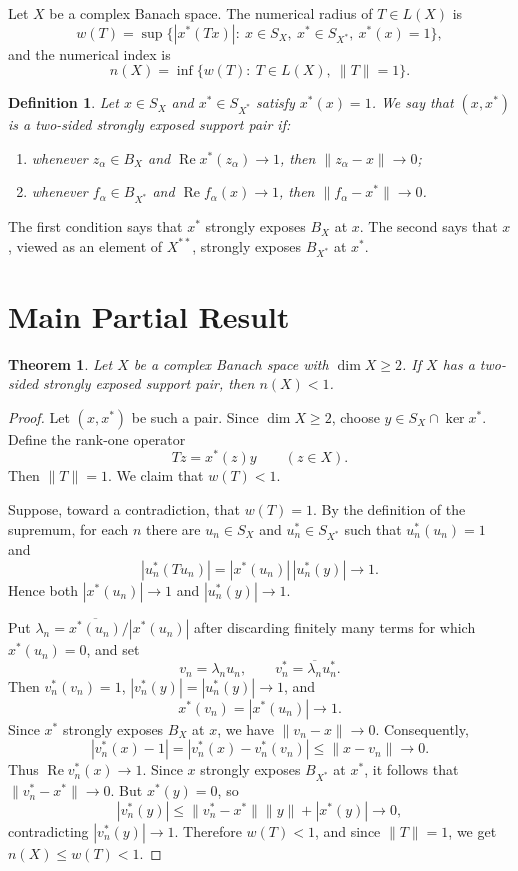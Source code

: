 \documentclass[11pt]{article}
\newtheorem{theorem}{Theorem}
\newtheorem{definition}{Definition}
\newcommand{\Ree}{\operatorname{Re}}
\begin{document}
Let $X$ be a complex Banach space.  The numerical radius of $T\in L(X)$ is
\[
  w(T)=\sup\{|x^*(Tx)|:\ x\in S_X,\ x^*\in S_{X^*},\ x^*(x)=1\},
\]
and the numerical index is
\[
  n(X)=\inf\{w(T):\ T\in L(X),\ \|T\|=1\}.
\]

\begin{definition}
Let $x\in S_X$ and $x^*\in S_{X^*}$ satisfy $x^*(x)=1$.
We say that $(x,x^*)$ is a two-sided strongly exposed support pair if:
\begin{enumerate}
\item whenever $z_\alpha\in B_X$ and $\Ree x^*(z_\alpha)\to 1$, then $\|z_\alpha-x\|\to 0$;
\item whenever $f_\alpha\in B_{X^*}$ and $\Ree f_\alpha(x)\to 1$, then $\|f_\alpha-x^*\|\to 0$.
\end{enumerate}
\end{definition}

The first condition says that $x^*$ strongly exposes $B_X$ at $x$.  The second says that $x$, viewed as an element of $X^{**}$, strongly exposes $B_{X^*}$ at $x^*$.

\section*{Main Partial Result}

\begin{theorem}
Let $X$ be a complex Banach space with $\dim X\ge 2$.  If $X$ has a two-sided strongly exposed support pair, then $n(X)<1$.
\end{theorem}

\begin{proof}
Let $(x,x^*)$ be such a pair.  Since $\dim X\ge 2$, choose $y\in S_X\cap \ker x^*$.  Define the rank-one operator
\[
  Tz=x^*(z)y\qquad (z\in X).
\]
Then $\|T\|=1$.  We claim that $w(T)<1$.

Suppose, toward a contradiction, that $w(T)=1$.  By the definition of the supremum, for each $n$ there are $u_n\in S_X$ and $u_n^*\in S_{X^*}$ such that $u_n^*(u_n)=1$ and
\[
  |u_n^*(Tu_n)|=|x^*(u_n)|\,|u_n^*(y)|\longrightarrow 1.
\]
Hence both $|x^*(u_n)|\to 1$ and $|u_n^*(y)|\to 1$.

Put $\lambda_n=\overline{x^*(u_n)}/|x^*(u_n)|$ after discarding finitely many terms for which $x^*(u_n)=0$, and set
\[
  v_n=\lambda_n u_n,\qquad v_n^*=\overline{\lambda_n}u_n^*.
\]
Then $v_n^*(v_n)=1$, $|v_n^*(y)|=|u_n^*(y)|\to 1$, and
\[
  x^*(v_n)=|x^*(u_n)|\to 1.
\]
Since $x^*$ strongly exposes $B_X$ at $x$, we have $\|v_n-x\|\to 0$.
Consequently,
\[
  |v_n^*(x)-1|=|v_n^*(x)-v_n^*(v_n)|\le \|x-v_n\|\to 0.
\]
Thus $\Ree v_n^*(x)\to 1$.  Since $x$ strongly exposes $B_{X^*}$ at $x^*$, it follows that $\|v_n^*-x^*\|\to 0$.  But $x^*(y)=0$, so
\[
  |v_n^*(y)|\le \|v_n^*-x^*\|\|y\|+|x^*(y)|\to 0,
\]
contradicting $|v_n^*(y)|\to 1$.  Therefore $w(T)<1$, and since $\|T\|=1$, we get $n(X)\le w(T)<1$.
\end{proof}
\end{document}
